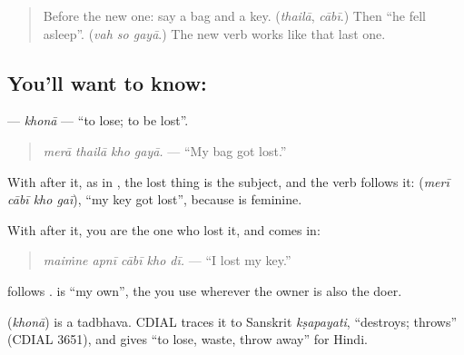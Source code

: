 \label{lesson:HI-C283-khona}



\begin{quote}
Before the new one: say a bag and a key. (\emph{thailā}, \emph{cābī}.) Then \textquotedblleft{}he fell asleep\textquotedblright{}. (\emph{vah so gayā}.) The new verb works like that last one.
\end{quote}

\subsection*{You'll want to know: }
\textbf{} — \emph{khonā} — \textquotedblleft{}to lose; to be lost\textquotedblright{}.

\begin{quote}
\textbf{   }
\end{quote}

\begin{quote}
\emph{merā thailā kho gayā.} — \textquotedblleft{}My bag got lost.\textquotedblright{}
\end{quote}

With \textbf{} after it, as in \textbf{ }, the lost thing is the subject, and the verb follows it: \textbf{   } (\emph{merī cābī kho gaī}), \textquotedblleft{}my key got lost\textquotedblright{}, because \textbf{} is feminine.

With \textbf{} after it, you are the one who lost it, and \textbf{} comes in:

\begin{quote}
\textbf{    }
\end{quote}

\begin{quote}
\emph{maiṁne apnī cābī kho dī.} — \textquotedblleft{}I lost my key.\textquotedblright{}
\end{quote}

\textbf{} follows \textbf{}. \textbf{} is \textquotedblleft{}my own\textquotedblright{}, the \textbf{} you use wherever the owner is also the doer.

\begin{cousinweb}
\textbf{} (\emph{khonā}) is a tadbhava. CDIAL traces it to Sanskrit \emph{kṣapayati}, \textquotedblleft{}destroys; throws\textquotedblright{} (CDIAL 3651), and gives \textquotedblleft{}to lose, waste, throw away\textquotedblright{} for Hindi.
\end{cousinweb}

